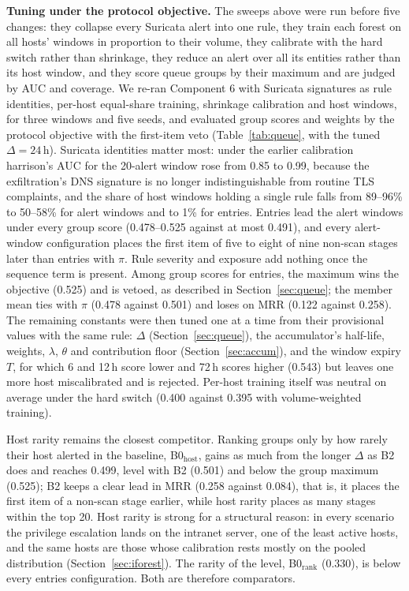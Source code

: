 \documentclass[conference]{IEEEtran}
\begin{document}
\textbf{Tuning under the protocol objective.} The sweeps above were run before five changes: they collapse every Suricata alert into one rule, they train each forest on all hosts' windows in proportion to their volume, they calibrate with the hard switch rather than shrinkage, they reduce an alert over all its entities rather than its host window, and they score queue groups by their maximum and are judged by AUC and coverage. We re-ran Component 6 with Suricata signatures as rule identities, per-host equal-share training, shrinkage calibration and host windows, for three windows and five seeds, and evaluated group scores and weights by the protocol objective with the first-item veto (Table~\ref{tab:queue}, with the tuned $\Delta = 24$\,h). Suricata identities matter most: under the earlier calibration harrison's AUC for the 20-alert window rose from 0.85 to 0.99, because the exfiltration's DNS signature is no longer indistinguishable from routine TLS complaints, and the share of host windows holding a single rule falls from 89--96\% to 50--58\% for alert windows and to 1\% for entries. Entries lead the alert windows under every group score (0.478--0.525 against at most 0.491), and every alert-window configuration places the first item of five to eight of nine non-scan stages later than entries with $\pi$. Rule severity and exposure add nothing once the sequence term is present. Among group scores for entries, the maximum wins the objective (0.525) and is vetoed, as described in Section~\ref{sec:queue}; the member mean ties with $\pi$ (0.478 against 0.501) and loses on MRR (0.122 against 0.258). The remaining constants were then tuned one at a time from their provisional values with the same rule: $\Delta$ (Section~\ref{sec:queue}), the accumulator's half-life, weights, $\lambda$, $\theta$ and contribution floor (Section~\ref{sec:accum}), and the window expiry $T$, for which 6 and 12\,h score lower and 72\,h scores higher (0.543) but leaves one more host miscalibrated and is rejected. Per-host training itself was neutral on average under the hard switch (0.400 against 0.395 with volume-weighted training).

Host rarity remains the closest competitor. Ranking groups only by how rarely their host alerted in the baseline, B0$_\mathrm{host}$, gains as much from the longer $\Delta$ as B2 does and reaches 0.499, level with B2 (0.501) and below the group maximum (0.525); B2 keeps a clear lead in MRR (0.258 against 0.084), that is, it places the first item of a non-scan stage earlier, while host rarity places as many stages within the top 20. Host rarity is strong for a structural reason: in every scenario the privilege escalation lands on the intranet server, one of the least active hosts, and the same hosts are those whose calibration rests mostly on the pooled distribution (Section~\ref{sec:iforest}). The rarity of the level, B0$_\mathrm{rank}$ (0.330), is below every entries configuration. Both are therefore comparators.
\end{document}
